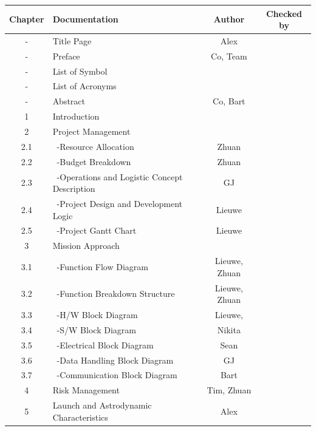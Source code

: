 \newpage
\begin{center}
\begin{longtable}{|c|l|c|c|}\hline
 Chapter & Documentation                      & Author & Checked by \\\hline 
 -       & Title Page                           & Alex   & \\\hline                  
 -       & Preface                              & Co, Team& \\\hline
 -       & List of Symbol                       &&\\\hline
 -       & List of Acronyms                       &&\\\hline
 -       & Abstract                             & Co, Bart &\\\hline
 1       & Introduction                         &&\\\hline\hline
 2       & Project Management                   &&\\\hline
 2.1     & \ -Resource Allocation               & Zhuan &\\\hline
 2.2     & \ -Budget Breakdown                  & Zhuan &\\\hline
 2.3     & \ -Operations and Logistic Concept Description & GJ &\\\hline
 2.4     & \ -Project Design and Development Logic & Lieuwe &\\\hline
 2.5     & \ -Project Gantt Chart               & Lieuwe &\\\hline\hline
 3       & Mission Approach                     &&\\\hline
 3.1     & \ -Function Flow Diagram             & Lieuwe, Zhuan & \\\hline
 3.2     & \ -Function Breakdown Structure      & Lieuwe, Zhuan &\\\hline
 3.3     & \ -H/W Block Diagram                 & Lieuwe, &\\\hline
 3.4     & \ -S/W Block Diagram                 & Nikita &\\\hline
 3.5     & \ -Electrical Block Diagram          & Sean &\\\hline
 3.6     & \ -Data Handling Block Diagram       & GJ &\\\hline
 3.7     & \ -Communication Block Diagram       & Bart &\\\hline
 4       & Risk Management                      & Tim, Zhuan & \\\hline\hline
 5       & Launch and Astrodynamic Characteristics & Alex &\\\hline

\end{longtable}
\end{center}
